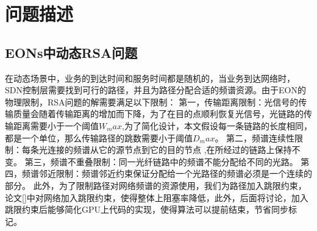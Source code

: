 \section{问题描述}
\subsection{EONs中动态RSA问题}
  在动态场景中，业务的到达时间和服务时间都是随机的，当业务到达网络时，SDN控制层需要找到可行的路径，并且为路径分配合适的频谱资源。由于EON的物理限制，RSA问题的解需要满足以下限制：
第一，传输距离限制：光信号的传输质量会随着传输距离的增加而下降，为了在目的点顺利恢复光信号，光链路的传输距离需要小于一个阈值$W_max$,为了简化设计，本文假设每一条链路的长度相同，都是一个单位，那么传输路径的跳数需要小于阈值$D_max$。
第二，频谱连续性限制：每条光连接的频谱从它的源节点到它的目的节点 ,在所经过的链路上保持不变。
第三，频谱不重叠限制：同一光纤链路中的频谱不能分配给不同的光路。
第四，频谱邻近限制：频谱邻近约束保证分配给一个光路径的频谱必须是一个连续的部分。
 此外，为了限制路径对网络频谱的资源使用，我们为路径加入跳限约束，论文[]中对网络加入跳限约束，使得整体上阻塞率降低，此外，后面将讨论，加入跳限约束后能够简化GPU上代码的实现，使得算法可以提前结束，节省同步标记。
